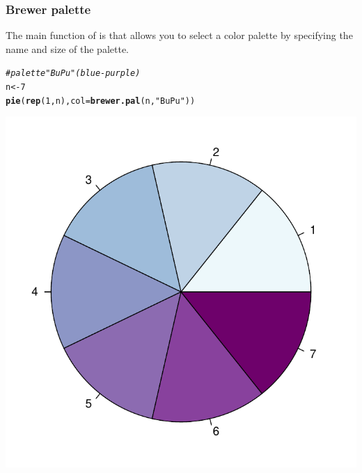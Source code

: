 \documentclass[12pt]{beamer}\usepackage[]{graphicx}\usepackage[]{color}
\makeatletter
\newcommand{\hlnum}[1]{\textcolor[rgb]{0.686,0.059,0.569}{#1}}%
\newcommand{\hlstr}[1]{\textcolor[rgb]{0.192,0.494,0.8}{#1}}%
\newcommand{\hlcom}[1]{\textcolor[rgb]{0.678,0.584,0.686}{\textit{#1}}}%
\newcommand{\hlstd}[1]{\textcolor[rgb]{0.345,0.345,0.345}{#1}}%
\newcommand{\hlkwb}[1]{\textcolor[rgb]{0.69,0.353,0.396}{#1}}%
\newcommand{\hlkwc}[1]{\textcolor[rgb]{0.333,0.667,0.333}{#1}}%
\newcommand{\hlkwd}[1]{\textcolor[rgb]{0.737,0.353,0.396}{\textbf{#1}}}%
\newenvironment{kframe}{%
 \def\at@end@of@kframe{}%
 \ifinner\ifhmode%
  \def\at@end@of@kframe{\end{minipage}}%
  \begin{minipage}{\columnwidth}%
 \fi\fi%
 \def\FrameCommand##1{\hskip\@totalleftmargin \hskip-\fboxsep
 \colorbox{shadecolor}{##1}\hskip-\fboxsep
     \hskip-\linewidth \hskip-\@totalleftmargin \hskip\columnwidth}%
 \MakeFramed {\advance\hsize-\width
   \@totalleftmargin\z@ \linewidth\hsize
   \@setminipage}}%
 {\par\unskip\endMakeFramed%
 \at@end@of@kframe}
\newenvironment{knitrout}{}{} %
\makeatother
\begin{document}
\begin{frame}[fragile]
\frametitle{Brewer palette}
The main function of  is {\hilit {}} that allows you to select a color palette by specifying the name and size of the palette.
\begin{knitrout}\scriptsize
{}\color{fgcolor}\begin{kframe}
\begin{alltt}
\hlcom{# palette "BuPu" (blue-purple)}
\hlstd{n} \hlkwb{<-} \hlnum{7}
\hlkwd{pie}\hlstd{(}\hlkwd{rep}\hlstd{(}\hlnum{1}\hlstd{, n),} \hlkwc{col} \hlstd{=} \hlkwd{brewer.pal}\hlstd{(n,} \hlstr{"BuPu"}\hlstd{))}
\end{alltt}
\end{kframe}

{\centering \includegraphics[width=.4\linewidth,height=.4\linewidth]{figure/brewerpal-1} 

}



\end{knitrout}
\end{frame}

\end{document}
